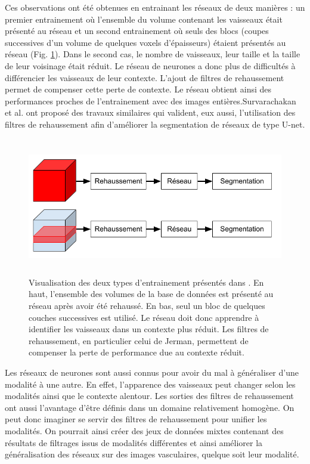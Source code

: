 Ces observations ont été obtenues en entrainant les réseaux de deux manières : un premier entrainement où l'ensemble du volume contenant les vaisseaux était présenté au réseau et un second entrainement où seuls des blocs (coupes successives d'un volume de quelques voxels d'épaisseurs) étaient présentés au réseau (Fig. \ref{fig:full_vs_slab}). Dans le second cas, le nombre de vaisseaux, leur taille et la taille de leur voisinage était réduit. Le réseau de neurones a donc plus de difficultés à différencier les vaisseaux de leur contexte. L'ajout de filtres de rehaussement permet de compenser cette perte de contexte. Le réseau obtient ainsi des performances proches de l'entrainement avec des images entières.Survarachakan et al. \cite{Survarachakan2021_deep_vesselness} ont proposé des travaux similaires qui valident, eux aussi, l'utilisation des filtres de rehaussement afin d'améliorer la segmentation de réseaux de type U-net.
\begin{figure}[!ht]
    \centering
    \includegraphics[height=6cm]{Images/full_vs_slab.png}
    \caption{Visualisation des deux types d'entrainement présentés dans \cite{Affane_2022_article_commun}. En haut, l'ensemble des volumes de la base de données est présenté au réseau après avoir été rehaussé. En bas, seul un bloc de quelques couches successives est utilisé. Le réseau doit donc apprendre à identifier les vaisseaux dans un contexte plus réduit. Les filtres de rehaussement, en particulier celui de Jerman, permettent de compenser la perte de performance due au contexte réduit.}
    \label{fig:full_vs_slab}
  \end{figure}

Les réseaux de neurones sont aussi connus pour avoir du mal à généraliser d'une modalité à une autre. En effet, l'apparence des vaisseaux peut changer selon les modalités ainsi que le contexte alentour. Les sorties des filtres de rehaussement ont aussi l'avantage d'être définis dans un domaine relativement homogène. On peut donc imaginer se servir des filtres de rehaussement pour unifier les modalités. On pourrait ainsi créer des jeux de données mixtes contenant des résultats de filtrages issus de modalités différentes et ainsi améliorer la généralisation des réseaux sur des images vasculaires, quelque soit leur modalité.

